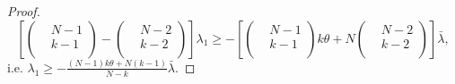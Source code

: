 \documentclass[11pt, reqno]{amsart}
\numberwithin{equation}{section}
\theoremstyle{definition}
\begin{document}
\begin{proof}
		\[\left[ \left( \begin{aligned}
			& N-1 \\ 
			& k-1 \\ 
		\end{aligned} \right)-\left( \begin{aligned}
			& N-2 \\ 
			& k-2 \\ 
		\end{aligned} \right) \right]{{\lambda }_{1}}\ge -\left[ \left( \begin{aligned}
			& N-1 \\ 
			& k-1 \\ 
		\end{aligned} \right)k\theta +N\left( \begin{aligned}
			& N-2 \\ 
			& k-2 \\ 
		\end{aligned} \right) \right]\bar{\lambda},\]
		i.e. ${{\lambda }_{1}}\ge -\frac{(N-1)k\theta +N(k-1)}{N-k}\bar{\lambda }.$
	\end{proof}
\end{document}
